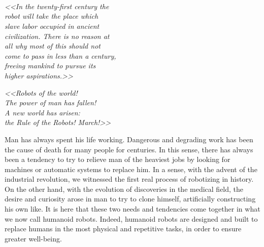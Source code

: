 \\
\\
\\
\begin{center}
    \textit{<<In the twenty-first century the \\
    robot will take the place which \\
    slave labor occupied in ancient \\ 
    civilization. There is no reason at \\ 
    all why most of this should not \\
    come to pass in less than a century, \\
    freeing mankind to pursue its \\
    higher aspirations.>>} \\ 
\end{center}


\begin{center}
    \textit{<<Robots of the world! \\
    The power of
man has fallen!\\ A new world has
arisen:\\ the Rule of the Robots!
March!>>}\\
\end{center}

Man has always spent his life working. Dangerous and degrading work has been the cause of death for many people for centuries. 
In this sense, there has always been a tendency to try to relieve man of the heaviest jobs by looking for machines or automatic systems to replace him.
In a sense, with the advent of the industrial revolution, we witnessed the first real process of robotizing in history.
On the other hand, with the evolution of discoveries in the medical field, the desire and curiosity arose in man to try to clone himself, artificially constructing his own like.
It is here that these two needs and tendencies come together in what we now call humanoid robots.
Indeed, humanoid robots are designed and built to replace humans in the most physical and repetitive tasks, in order to ensure greater well-being.

\newpage


